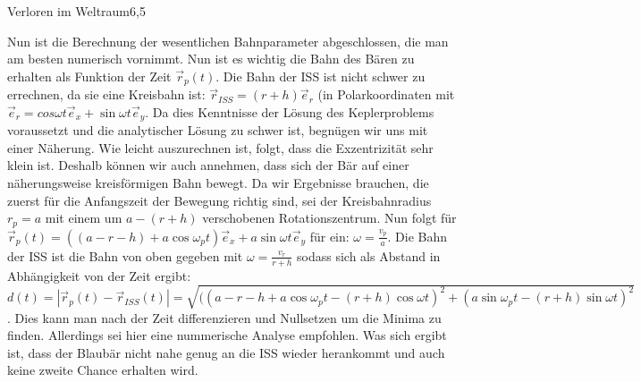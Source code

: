 \begin{problem}{Verloren im Weltraum}{6,5}
\begin{solution}
Nun ist die Berechnung der wesentlichen Bahnparameter abgeschlossen, die man am besten numerisch vornimmt. Nun ist es wichtig die Bahn des Bären zu erhalten als Funktion der Zeit $\vec{r}_p(t)$. Die Bahn der ISS ist nicht schwer zu errechnen, da sie eine Kreisbahn ist: $\vec{r}_{ISS}=(r+h)\vec{e}_{r}$ (in Polarkoordinaten mit $\vec{e}_r=cos{\omega t}\vec{e}_x+\sin{\omega t}\vec{e}_y$. Da dies Kenntnisse der Lösung des Keplerproblems voraussetzt und die analytischer Lösung zu schwer ist, begnügen wir uns mit einer Näherung. Wie leicht auszurechnen ist, folgt, dass die Exzentrizität sehr klein ist. Deshalb können wir auch annehmen, dass sich der Bär auf einer näherungsweise kreisförmigen Bahn bewegt. Da wir Ergebnisse brauchen, die zuerst für die Anfangszeit der Bewegung richtig sind, sei der Kreisbahnradius $r_p=a$ mit einem um $a-(r+h)$ verschobenen Rotationszentrum. Nun folgt für $\vec{r}_p(t)=((a-r-h)+a\cos{\omega_p t})\vec{e}_x+a\sin{\omega t}\vec{e}_y$ für ein: $\omega=\frac{v_p}{a}$. Die Bahn der ISS ist die Bahn von oben gegeben mit $\omega=\frac{v_r}{r+h}$ sodass sich als Abstand in Abhängigkeit von der Zeit ergibt: $d(t)=|\vec{r}_p(t)-\vec{r}_{ISS}(t)|=\sqrt{((a-r-h+a\cos{\omega_p t}-(r+h)\cos{\omega t})^2+(a\sin{\omega_p t}-(r+h)\sin{\omega t})^2}$. Dies kann man nach der Zeit differenzieren und Nullsetzen um die Minima zu finden. Allerdings sei hier eine nummerische Analyse empfohlen. Was sich ergibt ist, dass der Blaubär nicht nahe genug an die ISS wieder herankommt und auch keine zweite Chance erhalten wird.
\end{solution}
\end{problem}


